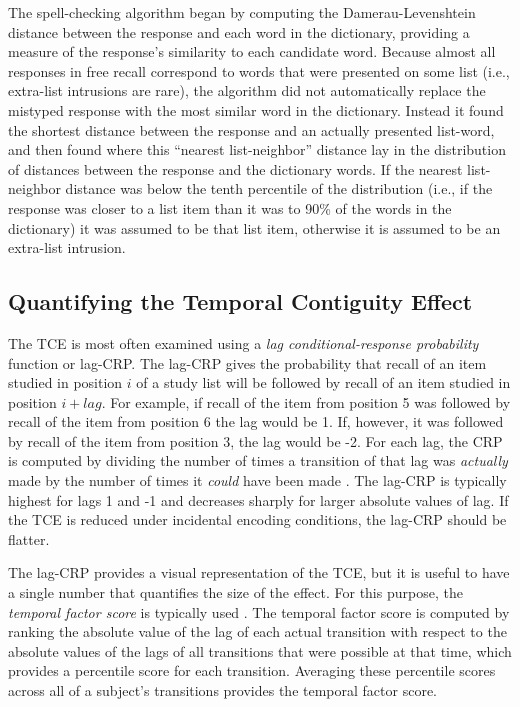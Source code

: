 \documentclass[jou,natbib]{apa6} %
\begin{document}
The spell-checking algorithm began by computing the Damerau-Levenshtein distance \citep{Dame64} between the response and each word in the dictionary, providing a measure of the response's similarity to each candidate word. Because almost all responses in free recall correspond to words that were presented on some list (i.e., extra-list intrusions are rare), the algorithm did not automatically replace the mistyped response with the most similar word in the dictionary. Instead it found the shortest distance between the response and an actually presented list-word, and then found where this ``nearest list-neighbor'' distance lay in the distribution of distances between the response and the dictionary words. If the nearest list-neighbor distance was below the tenth percentile of the distribution (i.e., if the response was closer to a list item than it was to 90\% of the words in the dictionary) it was assumed to be that list item, otherwise it is assumed to be an extra-list intrusion.

\subsection{Quantifying the Temporal Contiguity Effect} The TCE is most often examined using a \textit{lag conditional-response probability} function or lag-CRP. The lag-CRP gives the probability that recall of an item studied in position $i$ of a study list will be followed by recall of an item studied in position $i+lag$. For example, if recall of the item from position 5 was followed  by recall of the item from position 6 the lag would be 1. If, however, it was followed by recall of the item from position 3, the lag would be -2. For each lag, the CRP is computed by dividing the number of times a transition of that lag was \emph{actually} made by the number of times it \emph{could} have been made \citep[e.g., it could not have been made if the item $i+lag$ was already recalled;][]{Kaha96}. The lag-CRP is typically highest for lags 1 and -1 and decreases sharply for larger absolute values of lag. If the TCE is reduced under incidental encoding conditions, the lag-CRP should be flatter.

The lag-CRP provides a visual representation of the TCE, but it is useful to have a single number that quantifies the size of the effect. For this purpose, the \emph{temporal factor score} is typically used \citep{SedeEtal10,PolyEtal09}. The temporal factor score is computed by ranking the absolute value of the lag of each actual transition with respect to the absolute values of the lags of all transitions that were possible at that time, which provides a percentile score for each transition. Averaging these percentile scores across all of a subject's transitions provides the temporal factor score.
 
\end{document}
